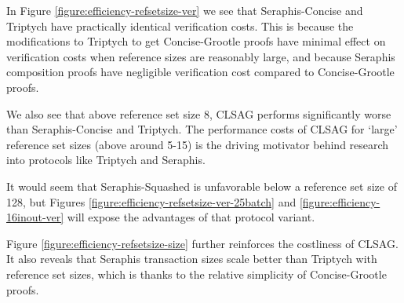 In Figure \ref{figure:efficiency-refsetsize-ver} we see that Seraphis-Concise and Triptych have practically identical verification costs. This is because the modifications to Triptych to get Concise-Grootle proofs have minimal effect on verification costs when reference sizes are reasonably large, and because Seraphis composition proofs have negligible verification cost compared to Concise-Grootle proofs.

We also see that above reference set size 8, CLSAG performs significantly worse than Seraphis-Concise and Triptych. The performance costs of CLSAG for `large' reference set sizes (above around 5-15) is the driving motivator behind research into protocols like Triptych and Seraphis.

It would seem that Seraphis-Squashed is unfavorable below a reference set size of 128, but Figures \ref{figure:efficiency-refsetsize-ver-25batch} and \ref{figure:efficiency-16inout-ver} will expose the advantages of that protocol variant.

Figure \ref{figure:efficiency-refsetsize-size} further reinforces the costliness of CLSAG. It also reveals that Seraphis transaction sizes scale better than Triptych with reference set sizes, which is thanks to the relative simplicity of Concise-Grootle proofs.

